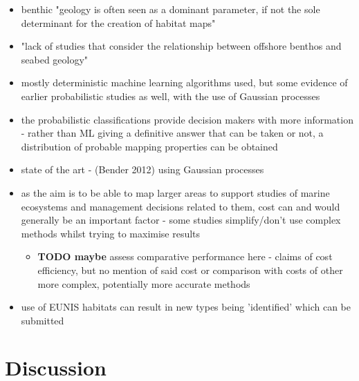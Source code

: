  \begin{itemize}
     \item benthic "geology is often seen as a dominant parameter, if not the sole determinant for the creation of habitat maps" ~\citep*{kostylev12}
     \item "lack of studies that consider the relationship between offshore benthos and seabed geology" ~\citep*{kostylev12}
     \item mostly deterministic machine learning algorithms used, but some evidence of earlier probabilistic studies as well, with the use of Gaussian processes ~\citep*{rigby10}
     \item the probabilistic classifications provide decision makers with more information - rather than ML giving a definitive answer that can be taken or not, a distribution of probable mapping properties can be obtained
     \item state of the art - (Bender 2012) using Gaussian processes ~\citep*{bender12}
     \item as the aim is to be able to map larger areas to support studies of marine ecosystems and management decisions related to them, cost can and would generally be an important factor - some studies simplify/don't use complex methods whilst trying to maximise results ~\citep*{micallef12}
         \begin{itemize}
             \item \textbf{TODO maybe} assess comparative performance here - claims of cost efficiency, but no mention of said cost or comparison with costs of other more complex, potentially more accurate methods
         \end{itemize}
     \item use of EUNIS habitats can result in new types being 'identified' which can be submitted ~\citep*{henriques14}
 \end{itemize}
 
 \section{Discussion}
 
